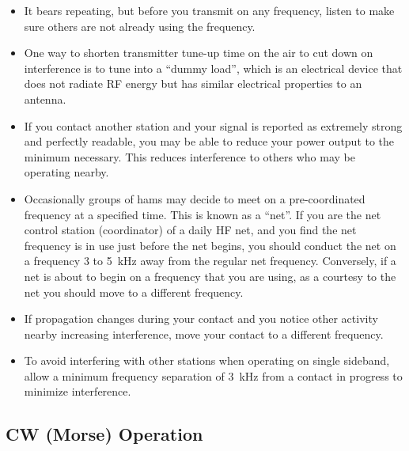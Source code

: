 \documentclass[letterpaper,12pt]{scrartcl}
\begin{document}
\begin{itemize}
\item It bears repeating, but before you transmit on any frequency, listen to make sure others are not already using the frequency.
\item One way to shorten transmitter tune-up time on the air to cut down on interference is to tune into a ``dummy load'', which is 
an electrical device that does not radiate RF energy but has similar electrical properties to an antenna.
\item If you contact another station and your signal is reported as extremely strong and perfectly readable,
you may be able to reduce your power output to the minimum necessary. This reduces interference to others who may be operating nearby.
\item Occasionally groups of hams may decide to meet on a pre-coordinated frequency at a specified time.
This is known as a ``net''. If you are the net control station (coordinator) of a daily HF net,
and you find the net frequency is in use just before the net begins,
you should conduct the net on a frequency 3 to 5~kHz away from the regular net frequency.
Conversely, if a net is about to begin on a frequency that you are using, as a courtesy to the net you should move to a different frequency.
\item If propagation changes during your contact and you notice other activity nearby increasing interference, move your contact to a different frequency.
\item To avoid interfering with other stations when operating on single sideband, allow a minimum frequency separation of 3~kHz from a contact in progress to minimize interference.
\end{itemize}

\subsection{CW (Morse) Operation}
\end{document}
